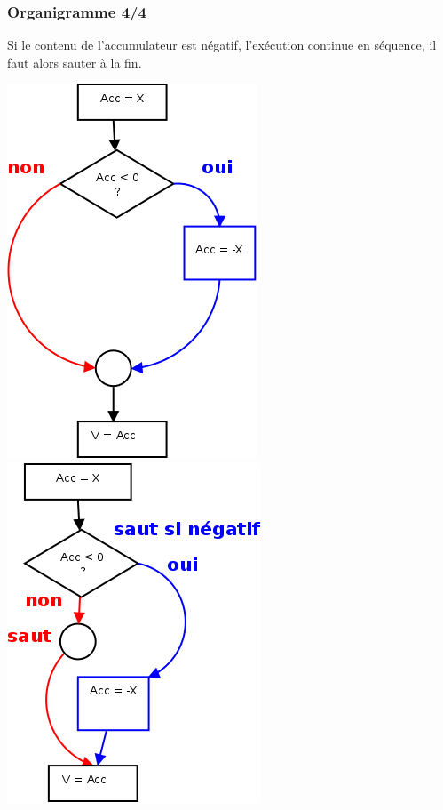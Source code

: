 \begin{frame}
  \frametitle{Organigramme 4/4}
Si le contenu de l'accumulateur est négatif, l'exécution continue en séquence, il faut alors sauter à la fin.
  \begin{multicols}{2}
\includegraphics[width=0.7\linewidth]{figures/val-abs-3}    
\break
\includegraphics[width=0.8\linewidth]{figures/val-abs-4}    
  \end{multicols}
\end{frame}

